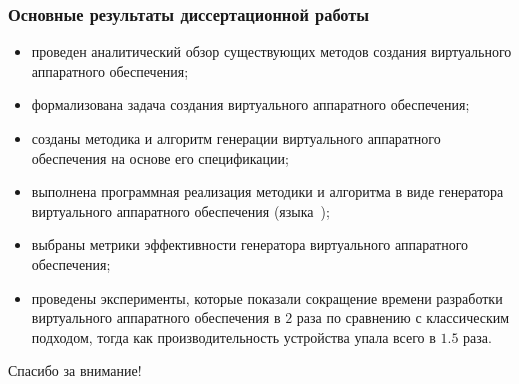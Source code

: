 \begin{frame}%
    \frametitle{Основные результаты диссертационной работы}
    \begin{itemize}
        \item проведен аналитический обзор существующих методов создания виртуального аппаратного обеспечения;
        \item формализована задача создания виртуального аппаратного обеспечения;
        \item созданы методика и алгоритм генерации виртуального аппаратного обеспечения на основе его спецификации;
        \item выполнена программная реализация методики и алгоритма в виде генератора
              виртуального аппаратного обеспечения \mbox{(языка {\mylanguage});}
        \item выбраны метрики эффективности генератора виртуального аппаратного обеспечения;
        \item проведены эксперименты, которые показали сокращение времени разработки
              виртуального аппаратного обеспечения в $2$ раза по сравнению с классическим
              подходом, тогда как производительность устройства упала всего в $1.5$ раза.
    \end{itemize}
\end{frame}


\begin{frame}%
    \begin{center}
        \Huge Спасибо за внимание!
    \end{center}
\end{frame}
